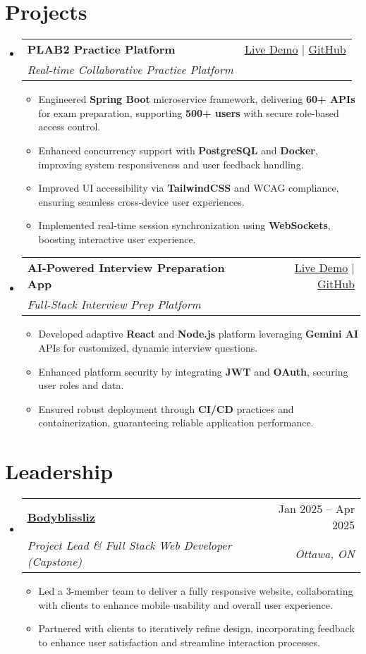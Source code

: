 \documentclass[letterpaper,11pt]{article}
\makeatletter
\newcommand{\resumeItem}[1]{\item\small{#1 \vspace{-2pt}}}
\newcommand{\resumeSubheading}[4]{
  \vspace{-1pt}\item
    \begin{tabular*}{0.97\textwidth}[t]{l@{\extracolsep{\fill}}r}
      \textbf{#1} & #2 \\
      \textit{\small#3} & \textit{\small #4} \\
    \end{tabular*}\vspace{-5pt}
}
\newcommand{\resumeSubHeadingListStart}{\begin{itemize}[leftmargin=*]}
\newcommand{\resumeSubHeadingListEnd}{\end{itemize}}
\newcommand{\resumeItemListStart}{\begin{itemize}}
\newcommand{\resumeItemListEnd}{\end{itemize}\vspace{-5pt}}
\makeatother
\begin{document}
\section{Projects}
  \resumeSubHeadingListStart
    \resumeSubheading
      {\textbf{PLAB2 Practice Platform}}{\href{https://plab2practice.com?utm_source=substrakt\&utm_medium=resume\&utm_campaign=job_application}{Live Demo} | \href{https://github.com/altansaid/plab2projectnew}{GitHub}}
      {Real-time Collaborative Practice Platform}{}
      \resumeItemListStart
        \resumeItem{Engineered \textbf{Spring Boot} microservice framework, delivering \textbf{60+ APIs} for exam preparation, supporting \textbf{500+ users} with secure role-based access control.}
        \resumeItem{Enhanced concurrency support with \textbf{PostgreSQL} and \textbf{Docker}, improving system responsiveness and user feedback handling.}
        \resumeItem{Improved UI accessibility via \textbf{TailwindCSS} and WCAG compliance, ensuring seamless cross-device user experiences.}
        \resumeItem{Implemented real-time session synchronization using \textbf{WebSockets}, boosting interactive user experience.}
      \resumeItemListEnd

    \resumeSubheading
      {\textbf{AI-Powered Interview Preparation App}}{\href{https://interviewcoach-ai.vercel.app}{Live Demo} | \href{https://github.com/altansaid/interviewcoach-ai}{GitHub}}
      {Full-Stack Interview Prep Platform}{}
      \resumeItemListStart
        \resumeItem{Developed adaptive \textbf{React} and \textbf{Node.js} platform leveraging \textbf{Gemini AI} APIs for customized, dynamic interview questions.}
        \resumeItem{Enhanced platform security by integrating \textbf{JWT} and \textbf{OAuth}, securing user roles and data.}
        \resumeItem{Ensured robust deployment through \textbf{CI/CD} practices and containerization, guaranteeing reliable application performance.}
      \resumeItemListEnd
  \resumeSubHeadingListEnd

\section{Leadership}
  \resumeSubHeadingListStart
    \resumeSubheading
      {\href{https://www.bodyblissliz.com}{Bodyblissliz}}{Jan 2025 -- Apr 2025}
      {Project Lead \& Full Stack Web Developer (Capstone)}{Ottawa, ON}
      \resumeItemListStart
        \resumeItem{Led a 3-member team to deliver a fully responsive website, collaborating with clients to enhance mobile usability
and overall user experience.}
        \resumeItem{Partnered with clients to iteratively refine design, incorporating feedback to enhance user satisfaction and streamline interaction processes.}
      \resumeItemListEnd
  \resumeSubHeadingListEnd
\end{document}

